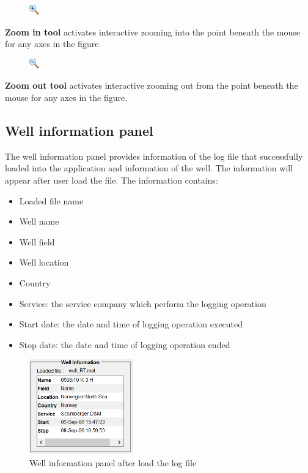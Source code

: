 \documentclass[12pt,a4paper,oneside]{report}
\begin{document}
\begin{figure}
\vspace{-15pt}
\includegraphics[scale=0.9]{fig/tool_zoom_in.png}
\end{figure}
\noindent \textbf{Zoom in tool} activates interactive zooming into the point beneath the mouse for any axes in the figure.

\begin{figure}
\vspace{-15pt}
\includegraphics[scale=0.9]{fig/tool_zoom_out.png}
\end{figure}
\noindent \textbf{Zoom out tool} activates interactive zooming out from the point beneath the mouse for any axes in the figure.

\subsection{Well information panel}
The well information panel provides information of the log file that successfully loaded into the application and information of the well. The information will appear after user load the file. The information contains:
\begin{itemize}
\setlength\itemsep{0.1em}
\item Loaded file name
\item Well name
\item Well field
\item Well location
\item Country
\item Service: the service company which perform the logging operation
\item Start date: the date and time of logging operation executed
\item Stop date: the date and time of logging operation ended
\end{itemize}

\begin{figure}[h]
\centering
\includegraphics[width=0.4\textwidth]{fig/well_info_panel.PNG}
\caption{Well information panel after load the log file}
\label{fig:well_info_panel}
\end{figure}
\end{document}
